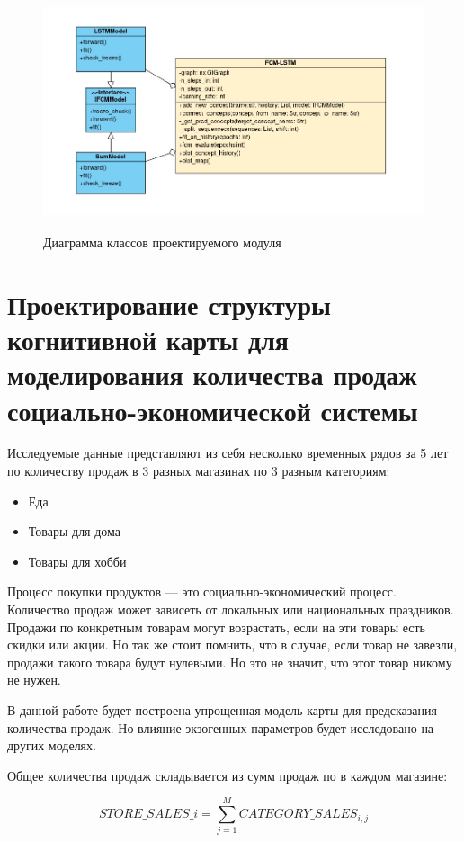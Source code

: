 \def\figurename{Рис}
\begin{figure}[t]
	\centering
	\includegraphics[height=7cm]{./img/class_diag.jpg}
	\caption{Диаграмма классов проектируемого модуля}
	\label{img:class_diag}
\end{figure}

\section{Проектирование структуры когнитивной карты для моделирования количества продаж социально-экономической системы}

Исследуемые данные представляют из себя несколько временных рядов
за 5 лет по количеству продаж в 3 разных магазинах по 3 разным категориям:

\begin{itemize}
	\item Еда
	\item Товары для дома
	\item Товары для хобби
\end{itemize}

Процесс покупки продуктов --- это социально-экономический процесс.
Количество продаж может зависеть от локальных или национальных праздников.
Продажи по конкретным товарам могут возрастать, если на эти товары есть скидки или акции.
Но так же стоит помнить, что в случае, если товар не завезли,
продажи такого товара будут нулевыми. Но это не значит, что этот товар никому не нужен.

В данной работе будет построена упрощенная модель карты для предсказания количества продаж.
Но влияние экзогенных параметров будет исследовано на других моделях.

Общее количества продаж складывается из сумм продаж
по в каждом магазине:

\begin{equation}\label{eq:sales_total_simple_model}
	STORE\_SALES\_{i} = \sum_{j=1}^{M} CATEGORY\_SALES_{i,j}
\end{equation}

